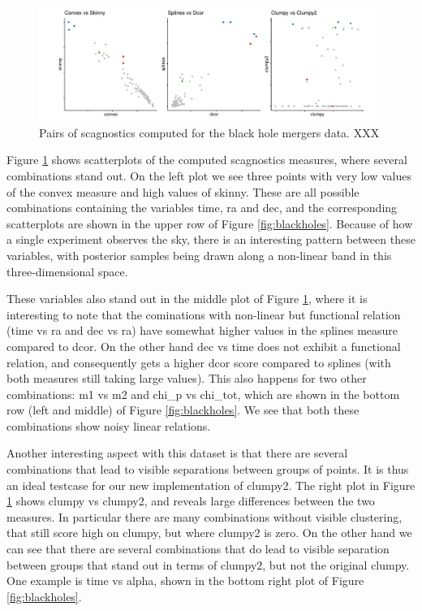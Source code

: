 \begin{Schunk}
\begin{figure}
\includegraphics[width=1\linewidth]{mason-lee-laa-cook_files/figure-latex/bbh-scags-static-1} \caption[Pairs of scagnostics computed for the black hole mergers data]{Pairs of scagnostics computed for the black hole mergers data. XXX}\label{fig:bbh-scags-static}
\end{figure}
\end{Schunk}

Figure \ref{fig:bbh-scags-static} shows scatterplots of the computed
scagnostics measures, where several combinations stand out. On the left
plot we see three points with very low values of the convex measure and
high values of skinny. These are all possible combinations containing
the variables time, ra and dec, and the corresponding scatterplots are
shown in the upper row of Figure \ref{fig:blackholes}. Because of how a
single experiment observes the sky, there is an interesting pattern
between these variables, with posterior samples being drawn along a
non-linear band in this three-dimensional space.

These variables also stand out in the middle plot of Figure
\ref{fig:bbh-scags-static}, where it is interesting to note that the
cominations with non-linear but functional relation (time vs ra and dec
vs ra) have somewhat higher values in the splines measure compared to
dcor. On the other hand dec vs time does not exhibit a functional
relation, and consequently gets a higher dcor score compared to splines
(with both measures still taking large values). This also happens for
two other combinations: m1 vs m2 and chi\_p vs chi\_tot, which are shown
in the bottom row (left and middle) of Figure \ref{fig:blackholes}. We
see that both these combinations show noisy linear relations.

Another interesting aspect with this dataset is that there are several
combinations that lead to visible separations between groups of points.
It is thus an ideal testcase for our new implementation of clumpy2. The
right plot in Figure \ref{fig:bbh-scags-static} shows clumpy vs clumpy2,
and reveals large differences between the two measures. In particular
there are many combinations without visible clustering, that still score
high on clumpy, but where clumpy2 is zero. On the other hand we can see
that there are several combinations that do lead to visible separation
between groups that stand out in terms of clumpy2, but not the original
clumpy. One example is time vs alpha, shown in the bottom right plot of
Figure \ref{fig:blackholes}.

